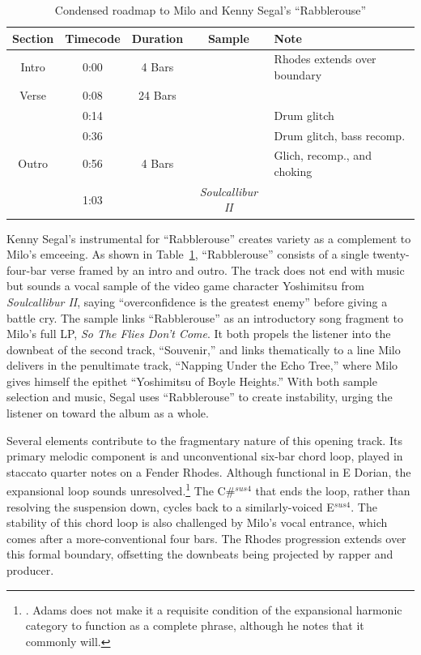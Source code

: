 \begin{table}[ht]
    \centering
        \begin{tabular}{|c|c|c|c|l|}
             \hline
            Section & Timecode & Duration & Sample                   & Note \\ \hline
            Intro   & 0:00     & 4 Bars   &                          & Rhodes extends over boundary \\ \hline
            Verse   & 0:08     & 24 Bars  &                          & \\ \hline
                    & 0:14     &          &                          & Drum glitch \\ \hline
                    & 0:36     &          &                          & Drum glitch, bass recomp. \\ \hline
            Outro   & 0:56     & 4 Bars   &                          & Glich, recomp., and choking \\ \hline
                    & 1:03     &          & \textit{Soulcallibur II} & \\ \hline
        \end{tabular}
    \caption{Condensed roadmap to Milo and Kenny Segal's ``Rabblerouse''}
    \label{tab:rabblerouse}
\end{table}

Kenny Segal's instrumental for ``Rabblerouse'' creates variety as a complement to Milo's emceeing.
As shown in Table~\ref{tab:rabblerouse}, ``Rabblerouse'' consists of a single twenty-four-bar verse
framed by an intro and outro. The track does not end with music but sounds a vocal sample of the 
video game character Yoshimitsu from \emph{Soulcallibur II}, saying ``overconfidence is the greatest
enemy'' before giving a battle cry. The sample links  ``Rabblerouse'' as an introductory song fragment
to Milo's full LP, \emph{So The Flies Don't Come}. It both propels the listener into the downbeat of 
the second track, ``Souvenir,'' and links thematically to a line Milo delivers in the penultimate track,
``Napping Under the Echo Tree,'' where Milo gives himself the epithet ``Yoshimitsu of Boyle Heights.''
With both sample selection and music, Segal uses ``Rabblerouse'' to create instability, urging the 
listener on toward the album as a whole.

Several elements contribute to the fragmentary nature of this opening track. Its primary melodic
component is and unconventional six-bar chord loop, played in staccato quarter notes on a Fender 
Rhodes. Although functional in E Dorian, the expansional loop sounds unresolved.\footnote{
    \cite{kyleadamsHarmonicSyntacticMotivic2020}. Adams does not make it a requisite condition
    of the expansional harmonic category to function as a complete phrase, although he notes that
    it commonly will.} 
The C\#$^{sus4}$ that ends the loop, rather than resolving the suspension down, cycles back to a
similarly-voiced E$^{sus4}$. The stability of this chord loop is also challenged by Milo's vocal 
entrance, which comes after a more-conventional four bars. The Rhodes progression extends over
this formal boundary, offsetting the downbeats being projected by rapper and producer.

